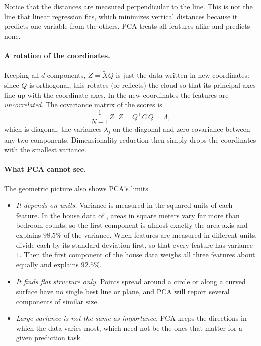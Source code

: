 Notice that the distances are measured perpendicular to the line. This
is not the line that linear regression fits, which minimizes vertical
distances because it predicts one variable from the others. PCA treats all
features alike and predicts none.

\paragraph{A rotation of the coordinates.}
Keeping all $d$ components, $Z = \tilde{X}Q$ is just the data written in
new coordinates: since $Q$ is orthogonal, this rotates (or reflects) the
cloud so that its principal axes line up with the coordinate axes. In
the new coordinates the features are \emph{uncorrelated}. The covariance
matrix of the scores is
\[
  \frac{1}{N - 1} Z^\top Z = Q^\top C\, Q = \Lambda ,
\]
which is diagonal: the variances $\lambda_j$ on the diagonal and zero
covariance between any two components. Dimensionality reduction then
simply drops the coordinates with the smallest variance.

\paragraph{What PCA cannot see.}
The geometric picture also shows PCA's limits.
\begin{itemize}
  \item \emph{It depends on units.} Variance is measured in the squared
    units of each feature. In the house data of ,
    areas in square meters vary far more than bedroom counts, so the
    first component is almost exactly the area axis and explains $98.5\%$
    of the variance. When features are measured in different units, divide
    each by its standard deviation first, so that every feature has
    variance $1$. Then the first component of the house data weighs all
    three features about equally and explains $92.5\%$.
  \item \emph{It finds flat structure only.} Points spread around a
    circle or along a curved surface have no single best line or plane,
    and PCA will report several components of similar size.
  \item \emph{Large variance is not the same as importance.} PCA keeps the
    directions in which the data varies most, which need not be the ones
    that matter for a given prediction task.
\end{itemize}

